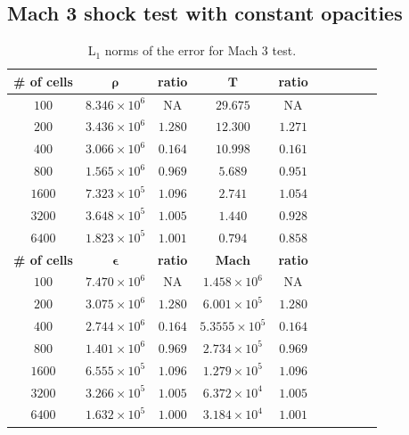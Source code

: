 \documentclass[times,doublespace]{fldauth}%
\begin{document}
\subsection{Mach 3 shock test with constant opacities}
%
\begin{table}[H]
\caption{\label{tbl:table1} L$_1$ norms of the error for Mach 3 test.}
\begin{center}
\begin{tabular}{|c|c|c|c|c|c|c|c|c|c|}
\hline
\textbf{\# of cells} & $\mathbf{\rho}$ & \textbf{ratio} & $\mathbf{T}$ & \textbf{ratio} \\ \hline
$100$ & $8.346\times 10^{6}$ & NA &  $29.675$ & NA \\ \hline
$200$ & $3.436\times 10^{6}$ & $1.280$ &  $12.300$ & $1.271$ \\ \hline
$400$ & $3.066\times10^{6}$ & $0.164$ &  $10.998$ & $0.161$ \\ \hline
$800$ & $1.565\times 10^{6}$ & $0.969$ &  $5.689$ & $0.951$ \\ \hline
$1600$ & $7.323\times 10^{5}$ & $1.096$ &  $2.741$ & $1.054$ \\ \hline
$3200$ & $3.648\times 10^{5}$ & $1.005$ & $1.440$ & $0.928$ \\ \hline
$6400$ & $1.823\times 10^{5}$ & $1.001$ & $0.794$ & $0.858$ \\ \hline
\hline
\textbf{\# of cells} & $\mathbf{\epsilon}$ & \textbf{ratio} &  $\mathbf{Mach}$ & \textbf{ratio} \\ \hline
$100$ & $7.470\times 10^{6}$ & NA & $1.458\times 10^6$ & NA	\\ \hline
$200$ & $3.075\times 10^{6}$ & $1.280$ & $6.001\times 10^5$ & $1.280$	\\ \hline
$400$ & $2.744\times 10^{6}$ & $0.164$ & $5.3555\times 10^5$ & $0.164$	\\ \hline
$800$ & $1.401\times 10^{6}$ & $0.969$ & $2.734\times 10^5$ & $0.969$	\\  \hline
$1600$&$6.555\times 10^{5}$ & $1.096$ & $1.279\times 10^5$ & $1.096$ \\ \hline 
$3200$ & $3.266\times10^{5}$  & $1.005$ & $6.372\times 10^4$ & $1.005$ \\ \hline   
$6400$ & $1.632\times 10^{5}$  & $1.000$ & $3.184\times10^4$ & $1.001$ \\ \hline   
\end{tabular}  
\end{center}
\end{table}
\end{document}
